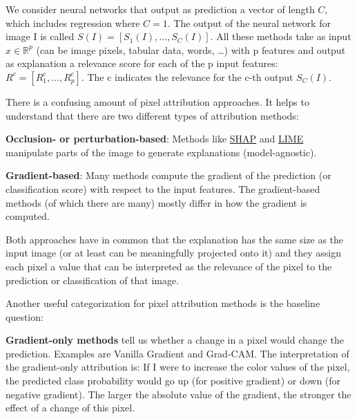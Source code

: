 \documentclass[
  11pt,
]{scrbook}
\begin{document}
We consider neural networks that output as prediction a vector of length \(C\), which includes regression where \(C=1\).
The output of the neural network for image I is called \(S(I)=[S_1(I),\ldots,S_C(I)]\).
All these methods take as input \(x\in\mathbb{R}^p\) (can be image pixels, tabular data, words, \ldots) with p features and output as explanation a relevance score for each of the p input features: \(R^c=[R_1^c,\ldots,R_p^c]\).
The c indicates the relevance for the c-th output \(S_C(I)\).

There is a confusing amount of pixel attribution approaches.
It helps to understand that there are two different types of attribution methods:

\textbf{Occlusion- or perturbation-based}: Methods like \protect\hyperlink{shapux5cux257D}{SHAP} and \protect\hyperlink{lime}{LIME} manipulate parts of the image to generate explanations (model-agnostic).

\textbf{Gradient-based}: Many methods compute the gradient of the prediction (or classification score) with respect to the input features. The gradient-based methods (of which there are many) mostly differ in how the gradient is computed.

Both approaches have in common that the explanation has the same size as the input image (or at least can be meaningfully projected onto it) and they assign each pixel a value that can be interpreted as the relevance of the pixel to the prediction or classification of that image.

Another useful categorization for pixel attribution methods is the baseline question:

\textbf{Gradient-only methods} tell us whether a change in a pixel would change the prediction. Examples are Vanilla Gradient and Grad-CAM.
The interpretation of the gradient-only attribution is:
If I were to increase the color values of the pixel, the predicted class probability would go up (for positive gradient) or down (for negative gradient).
The larger the absolute value of the gradient, the stronger the effect of a change of this pixel.
\end{document}
